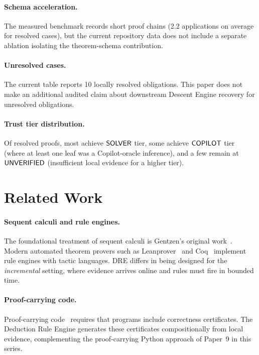 \documentclass[11pt]{article}
\begin{document}
\paragraph{Schema acceleration.}
The measured benchmark records short proof chains (2.2 applications on
average for resolved cases), but the current repository data does not
include a separate ablation isolating the theorem-schema contribution.

\paragraph{Unresolved cases.}
The current table reports 10 locally resolved obligations.  This paper
does not make an additional audited claim about downstream Descent
Engine recovery for unresolved obligations.

\paragraph{Trust tier distribution.}
Of resolved proofs, most achieve $\mathsf{SOLVER}$ tier, some
achieve $\mathsf{COPILOT}$ tier (where at least one leaf was a Copilot-oracle
inference), and a few remain at $\mathsf{UNVERIFIED}$ (insufficient local
evidence for a higher tier).

\section{Related Work}\label{sec:related}

\paragraph{Sequent calculi and rule engines.}
The foundational treatment of sequent calculi is Gentzen's original
work~\cite{gentzen1935}.  Modern automated theorem provers such as
Leanprover~\cite{moura2021lean4} and Coq~\cite{coq2024} implement
rule engines with tactic languages.  \textsc{DRE} differs in being
designed for the \emph{incremental} setting, where evidence arrives
online and rules must fire in bounded time.

\paragraph{Proof-carrying code.}
Proof-carrying code~\cite{necula1997} requires that programs include
correctness certificates.  The Deduction Rule Engine generates these
certificates compositionally from local evidence, complementing the
proof-carrying Python approach of Paper~9 in this series.
\end{document}
